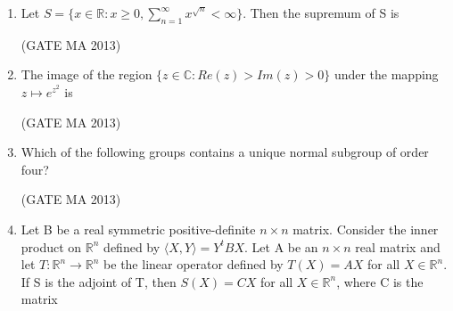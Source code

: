 \documentclass[journal,12pt,onecolumn]{IEEEtran}
\theoremstyle{remark}
\begin{document}
\begin{enumerate}
    \item Let $S = \{x \in \mathbb{R} : x \ge 0, \sum_{n=1}^{\infty} x^{\sqrt{n}} < \infty\}$. Then the supremum of S is
    \begin{enumerate}
    \end{enumerate}
    \hfill (GATE MA 2013)
    \item The image of the region $\{z \in \mathbb{C} : Re(z) > Im(z) > 0\}$ under the mapping $z \mapsto e^{z^2}$ is
    \begin{enumerate}
    \end{enumerate}
    \hfill (GATE MA 2013)
    \item Which of the following groups contains a unique normal subgroup of order four?
    \begin{enumerate}
    \end{enumerate}
    \hfill (GATE MA 2013)
    \item Let B be a real symmetric positive-definite $n \times n$ matrix. Consider the inner product on $\mathbb{R}^n$ defined by $\langle X, Y \rangle = Y^t BX$. Let A be an $n \times n$ real matrix and let $T: \mathbb{R}^n \rightarrow \mathbb{R}^n$ be the linear operator defined by $T(X) = AX$ for all $X \in \mathbb{R}^n$. If S is the adjoint of T, then $S(X) = CX$ for all $X \in \mathbb{R}^n$, where C is the matrix

\end{enumerate}
\end{document}
